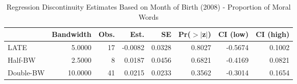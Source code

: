 \begin{table}[ht]
\centering
\begin{tabular}{lrrrrrrr}
  \hline
 & Bandwidth & Obs. & Est. & SE & Pr($>$$|$z$|$) & CI (low) & CI (high) \\ 
  \hline
LATE & 5.0000 & 17 & -0.0082 & 0.0328 & 0.8027 & -0.5674 & 0.1002 \\ 
  Half-BW & 2.5000 & 8 & 0.0187 & 0.0456 & 0.6821 & -0.4169 & 0.0821 \\ 
  Double-BW & 10.0000 & 41 & 0.0215 & 0.0233 & 0.3562 & -0.3014 & 0.1654 \\ 
   \hline
\end{tabular}
\caption{Regression Discontinuity Estimates Based on Month of Birth (2008) - Proportion of Moral Words} 
\label{tab:Xrd2008m1}
\end{table}
